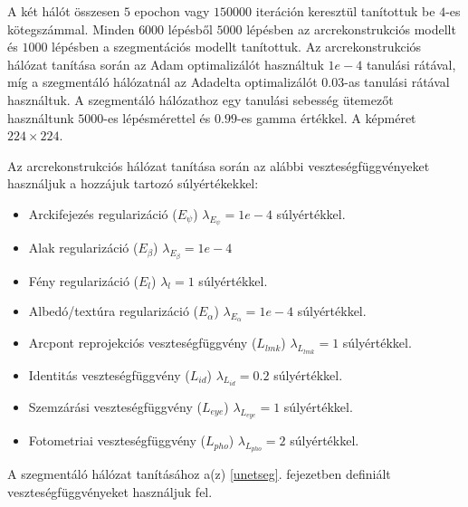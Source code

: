 \documentclass[12pt,a4]{article}
\begin{document}
        A két hálót összesen $5$ epochon vagy $150000$ iteráción keresztül tanítottuk be $4$-es kötegszámmal. Minden $6000$ lépésből $5000$ lépésben az arcrekonstrukciós modellt és $1000$ lépésben a szegmentációs modellt tanítottuk. Az arcrekonstrukciós hálózat tanítása során az Adam optimalizálót használtuk $1e-4$ tanulási rátával, míg a szegmentáló hálózatnál az Adadelta optimalizálót $0.03$-as tanulási rátával használtuk.
        A szegmentáló hálózathoz egy tanulási sebesség ütemezőt használtunk $5000$-es lépésmérettel és $0.99$-es gamma értékkel. A képméret $224 \times 224$.

        Az arcrekonstrukciós hálózat tanítása során az alábbi veszteségfüggvényeket használjuk a hozzájuk tartozó súlyértékekkel:
        \begin{itemize}
            \item Arckifejezés regularizáció ($E_{\psi}$) $\lambda_{E_{\psi}} = 1e - 4$ súlyértékkel.
            
            \item Alak regularizáció ($E_{\beta}$) $\lambda_{E_{\beta}} = 1e - 4$
            
            \item Fény regularizáció ($E_{l}$) $\lambda_{l} = 1$ súlyértékkel.
            
            \item Albedó/textúra regularizáció ($E_{\alpha}$) $\lambda_{E_{\alpha}} = 1e-4$ súlyértékkel.
            
            \item Arcpont reprojekciós veszteségfüggvény ($L_{lmk}$)
            $\lambda_{L_{lmk}} = 1$ súlyértékkel.
            
            \item Identitás veszteségfüggvény ($L_{id}$)
            $\lambda_{L_{id}} = 0.2$ súlyértékkel.
            
            \item Szemzárási veszteségfüggvény ($L_{eye}$)
            $\lambda_{L_{eye}} = 1$ súlyértékkel.
            
            \item Fotometriai veszteségfüggvény ($L_{pho}$)
            $\lambda_{L_{pho}} = 2$ súlyértékkel.
        
        \end{itemize}

        A szegmentáló hálózat tanításához a(z) \ref{unetseg}. fejezetben definiált veszteségfüggvényeket használjuk fel.
\end{document}
